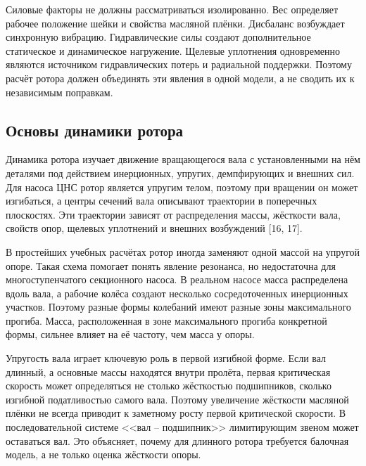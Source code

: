 Силовые факторы не должны рассматриваться изолированно. Вес определяет рабочее положение шейки и свойства масляной плёнки. Дисбаланс возбуждает синхронную вибрацию. Гидравлические силы создают дополнительное статическое и динамическое нагружение. Щелевые уплотнения одновременно являются источником гидравлических потерь и радиальной поддержки. Поэтому расчёт ротора должен объединять эти явления в одной модели, а не сводить их к независимым поправкам.

\subsection{Основы динамики ротора}

Динамика ротора изучает движение вращающегося вала с установленными на нём деталями под действием инерционных, упругих, демпфирующих и внешних сил. Для насоса ЦНС ротор является упругим телом, поэтому при вращении он может изгибаться, а центры сечений вала описывают траектории в поперечных плоскостях. Эти траектории зависят от распределения массы, жёсткости вала, свойств опор, щелевых уплотнений и внешних возбуждений [16, 17].

В простейших учебных расчётах ротор иногда заменяют одной массой на упругой опоре. Такая схема помогает понять явление резонанса, но недостаточна для многоступенчатого секционного насоса. В реальном насосе масса распределена вдоль вала, а рабочие колёса создают несколько сосредоточенных инерционных участков. Поэтому разные формы колебаний имеют разные зоны максимального прогиба. Масса, расположенная в зоне максимального прогиба конкретной формы, сильнее влияет на её частоту, чем масса у опоры.

Упругость вала играет ключевую роль в первой изгибной форме. Если вал длинный, а основные массы находятся внутри пролёта, первая критическая скорость может определяться не столько жёсткостью подшипников, сколько изгибной податливостью самого вала. Поэтому увеличение жёсткости масляной плёнки не всегда приводит к заметному росту первой критической скорости. В последовательной системе <<вал -- подшипник>> лимитирующим звеном может оставаться вал. Это объясняет, почему для длинного ротора требуется балочная модель, а не только оценка жёсткости опоры.

